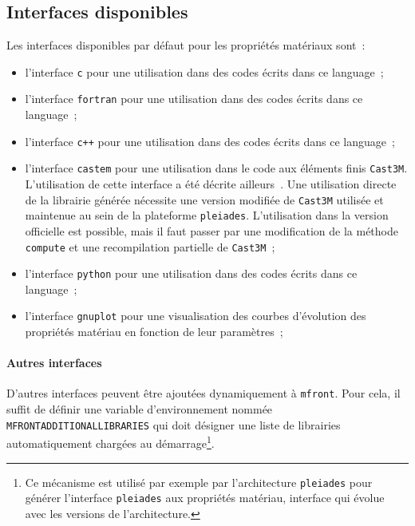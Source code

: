 \documentclass[rectoverso,pleiades,pstricks,leqno,anti]{texmf/note_technique_2010}
\newcommand{\pleiades}{\texttt{pleiades}}
\newcommand{\mfront}{\texttt{mfront}}
\newcommand{\castem}{\texttt{Cast3M}}
\begin{document}
\subsection{Interfaces disponibles} Les interfaces disponibles par
défaut pour les propriétés matériaux sont~:
\begin{itemize}
  \item l'interface \texttt{c} pour une utilisation dans des codes
  écrits dans ce language~;
  \item l'interface \texttt{fortran} pour une utilisation dans des codes
  écrits dans ce language~;
  \item l'interface \texttt{c++} pour une utilisation dans des codes
  écrits dans ce language~;
  \item l'interface \texttt{castem} pour une utilisation dans le code
  aux éléments finis \castem{}. L'utilisation de cette interface a été
  décrite ailleurs~\cite{helfer07:_utilis}. Une utilisation directe de
  la librairie générée nécessite une version modifiée de \castem{}
  utilisée et maintenue au sein de la plateforme \pleiades{}.
  L'utilisation dans la version officielle est possible, mais il faut
  passer par une modification de la méthode {\tt compute} et une
  recompilation partielle de \castem{}~;
  \item l'interface \texttt{python} pour une utilisation dans des codes
  écrits dans ce language~;
  \item l'interface \texttt{gnuplot} pour une visualisation des courbes
  d'évolution des propriétés matériau en fonction de leur paramètres~;
\end{itemize}

\paragraph{Autres interfaces} D'autres interfaces peuvent être ajoutées
dynamiquement à \mfront{}. Pour cela, il suffit de définir une variable
d'environnement nommée {\tt
  MFRONT\textunderscore{}\-ADDITIONAL\textunderscore{}\-LIBRARIES} qui
doit désigner une liste de librairies automatiquement chargées au
démarrage\footnote{Ce mécanisme est utilisé par exemple par
  l'architecture \pleiades{} pour générer l'interface {\tt pleiades} aux
  propriétés matériau, interface qui évolue avec les versions de
  l'architecture.}.
\end{document}
